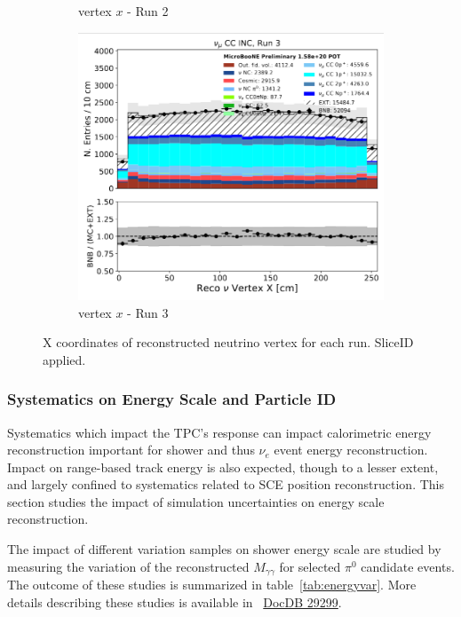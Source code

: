 \begin{figure}[hbt!]
\begin{center}
\begin{subfigure}[b]{0.3\textwidth}
    \caption{\label{fig:systematics:run2:nuvtxx}vertex $x$ - Run 2}
    \end{subfigure} %
    \begin{subfigure}[b]{0.3\textwidth}
    \centering
    \includegraphics[width=1.00\textwidth]{detsys/light/vtx_x_3.png}
    \caption{\label{fig:systematics:run3:nuvtxx}vertex $x$ - Run 3}
    \end{subfigure}
\caption{X coordinates of reconstructed neutrino vertex for each run. SliceID applied.}
\label{fig:systematics:numu:nuvtxx}
\end{center}
\end{figure}

\subsubsection{Systematics on Energy Scale and Particle ID} 
\label{sec:detsys:tpc}
Systematics which impact the TPC's response can impact calorimetric energy reconstruction important for shower and thus $\nu_e$ event energy reconstruction. Impact on range-based track energy is also expected, though to a lesser extent, and largely confined to systematics related to SCE position reconstruction. This section studies the impact of simulation uncertainties on energy scale reconstruction.
\par The impact of different variation samples on shower energy scale are studied by measuring the variation of the reconstructed $M_{\gamma\gamma}$ for selected $\pi^0$ candidate events. The outcome of these studies is summarized in table~\ref{tab:energyvar}. More details describing these studies is available in ~\href{https://microboone-docdb.fnal.gov/cgi-bin/private/ShowDocument?docid=29299}{DocDB 29299}.



